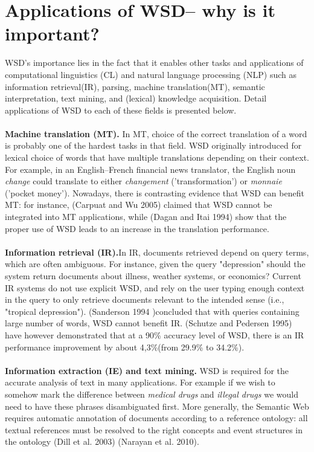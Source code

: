 \section{Applications of WSD-- why is it important?}
WSD's importance lies in the fact that it enables other tasks and applications of computational  linguistics (CL) and natural language processing (NLP) such as information retrieval(IR), parsing,  machine translation(MT), semantic interpretation, text mining, and (lexical) knowledge acquisition. Detail 
applications of WSD to each of these fields is presented below. 
\\\\ 
\textbf{Machine translation (MT).} In MT, choice of the correct translation of a word is probably one of the hardest tasks in that 
field. WSD originally introduced for lexical choice of words that have multiple translations depending on their context. For 
example, in an English--French financial news translator, the English noun \textit{change} could translate to either 
\textit{changement }('transformation') or \textit{monnaie} ('pocket money'). Nowadays, there is contrasting evidence that 
WSD can benefit MT: for instance, (Carpuat and Wu 2005) claimed that WSD cannot be integrated into
MT applications, while (Dagan and Itai 1994) show that the
proper use of WSD leads to an increase in the translation performance.
\\\\   
\textbf{Information retrieval (IR).}In IR, documents retrieved depend on query terms, which are often ambiguous. For instance, given the query "depression" should the system return documents about illness, weather systems, or economics? Current IR systems do not use explicit WSD, and rely on the user typing enough context in the query to only retrieve documents relevant to the intended sense (i.e., "tropical depression"). (Sanderson 1994 )concluded that with 
 queries containing large number of words, WSD cannot benefit IR. (Schutze and Pedersen 1995) have however demonstrated 
that at a 90\% accuracy level of WSD, there is an IR performance improvement by about 4,3\%(from 29.9\% to 34.2\%).
\\\\  
\textbf{Information extraction (IE) and text mining.} WSD is required for the accurate analysis of text in many applications. For example if we wish to somehow mark the difference between \textit{medical drugs} and \textit{illegal drugs} we would need to have these phrases disambiguated first. More generally, the Semantic Web requires automatic annotation of documents according to a reference ontology: all textual references must be resolved to the right concepts and event structures in the ontology (Dill et al. 2003) (Narayan et al. 2010).
